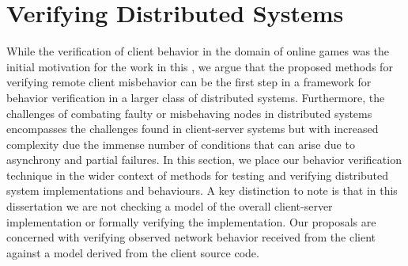 \section{Verifying Distributed Systems}

While the verification of client behavior in the domain of online
games was the initial motivation for the work in this \dissertation,
we argue that the proposed methods for verifying remote client
misbehavior can be the first step in a framework for behavior verification in a
larger class of distributed systems. Furthermore, the challenges of
combating faulty or misbehaving nodes in distributed systems
encompasses the challenges found in client-server systems but with
increased complexity due the immense number of conditions that can
arise due to asynchrony and partial failures. In this section, we
place our behavior verification technique in the wider context of methods
for testing and verifying distributed system implementations and
behaviours. A key distinction to note is that in this dissertation we are
not checking a model of the overall client-server implementation or
formally verifying the implementation. Our proposals
are concerned with verifying observed network behavior received from
the client against a model derived from the client source code.

